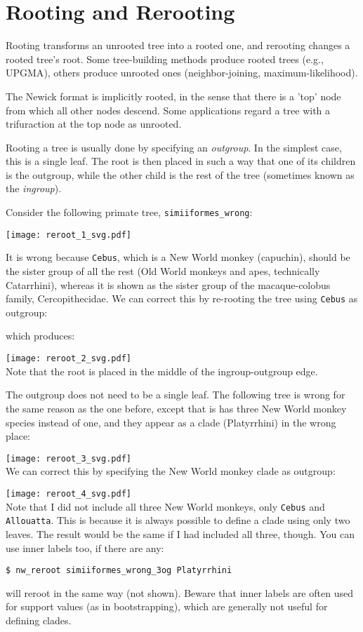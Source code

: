 
\section{Rooting and Rerooting}
\label{sct_reroot}

Rooting transforms an unrooted tree into a rooted one, and rerooting changes a rooted tree's root. Some tree-building methods produce rooted trees (e.g., \textsc{UPGMA}), others produce unrooted ones (neighbor-joining, maximum-likelihood). 

The Newick format is implicitly rooted, in the sense that there is a 'top' node from which all other nodes descend. Some applications regard a tree with a trifuraction at the top node as unrooted. 

Rooting a tree is usually done by specifying an \textit{outgroup}. In the simplest case, this is a single leaf. The root is then placed in such a way that one of its children is the outgroup, while the other child is the rest of the tree (sometimes known as the \textit{ingroup}). 

Consider the following primate tree, \texttt{simiiformes\_wrong}:

\texttt{[image: reroot\_1\_svg.pdf]}

\noindent{}It is wrong because \texttt{Cebus}, which is a New World monkey (capuchin), should be the sister group of all the rest (Old World monkeys and apes, technically Catarrhini), whereas it is shown as the sister group of the macaque-colobus family, Cercopithecidae. We can correct this by re-rooting the tree using \texttt{Cebus} as outgroup:

which produces:

\texttt{[image: reroot\_2\_svg.pdf]} \\

\noindent{}Note that the root is placed in the middle of the ingroup-outgroup
edge.

The outgroup does not need to be a single leaf. The following tree is
wrong for the same reason as the one before, except that is has three New World
monkey species instead of one, and they appear as a clade (Platyrrhini) in the
wrong place:

\texttt{[image: reroot\_3\_svg.pdf]} \\

\noindent{}We can correct this by specifying the New World monkey clade as outgroup:



\texttt{[image: reroot\_4\_svg.pdf]} \\

\noindent{}Note that I did not include all three New World monkeys, only \texttt{Cebus} and \texttt{Allouatta}. This is because it is always possible to define a clade using only two leaves. The result would be the same if I had included all three, though. You can use inner labels too, if there are any:
\begin{verbatim}
$ nw_reroot simiiformes_wrong_3og Platyrrhini
\end{verbatim}
will reroot in the same way (not shown). Beware that inner labels are often used for support values (as in bootstrapping), which are generally not useful for defining clades.
